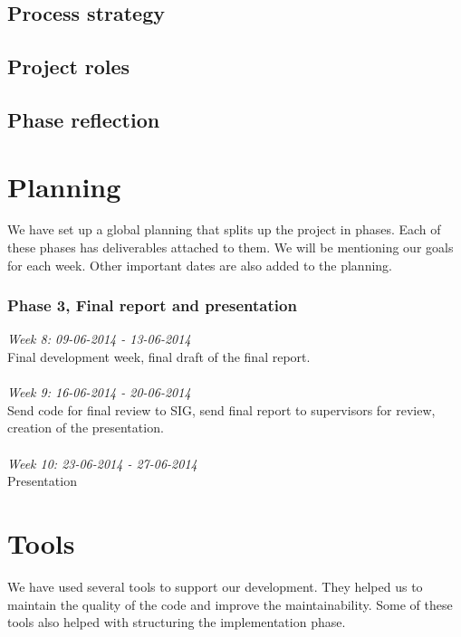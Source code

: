 \subsection{Process strategy}

\subsection{Project roles}

\subsection{Phase reflection}


\section{Planning}
We have set up a global planning that splits up the project in phases.
Each of these phases has deliverables attached to them.
We will be mentioning our goals for each week.
Other important dates are also added to the planning.

\subsubsection{Phase 3, Final report and presentation}

\noindent\emph{Week 8: 09-06-2014 - 13-06-2014}\\
Final development week, final draft of the final report.
\\\\
\noindent\emph{Week 9: 16-06-2014 - 20-06-2014}\\
Send code for final review to SIG, send final report to supervisors for review, creation of the presentation.
\\\\
\noindent\emph{Week 10: 23-06-2014 - 27-06-2014}\\
Presentation

\section{Tools}
We have used several tools to support our development.
They helped us to maintain the quality of the code and improve the maintainability.
Some of these tools also helped with structuring the implementation phase.

